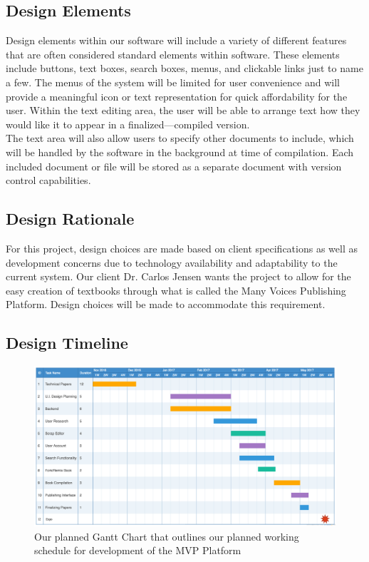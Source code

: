 \documentclass[onecolumn, draftclsnofoot,10pt, compsoc]{IEEEtran}
\begin{document}
\subsection{Design Elements}
\noindent Design elements within our software will include a variety 
of different features that are often considered standard elements 
within software. These elements include buttons, text boxes, search boxes, 
menus, and clickable links just to name a few. The menus of the system will be 
limited for user convenience and will provide a meaningful icon or text 
representation for quick affordability for the user. Within the text editing 
area, the user will be able to arrange text how they would like it to appear 
in a finalized---compiled version. \\

\noindent The text area will also allow users to specify other documents to 
include, which will be handled by the software in the background at time of 
compilation. Each included document or file will be stored as a separate 
document with version control capabilities. \\


\subsection{Design Rationale}
\noindent For this project, design choices are made based on client 
specifications as well as development concerns due to technology availability 
and adaptability to the current system. Our client Dr. Carlos Jensen wants the 
project to allow for the easy creation of textbooks through what is called the 
Many Voices Publishing Platform. Design choices will be made to accommodate 
this requirement.


\newpage
\subsection{Design Timeline}
\begin{figure}[ht!]
\centering
\includegraphics[width=160mm]{gantt_chart.png}
\caption{Our planned Gantt Chart that outlines our planned working schedule for development of the MVP Platform}
\end{figure}
\end{document}

